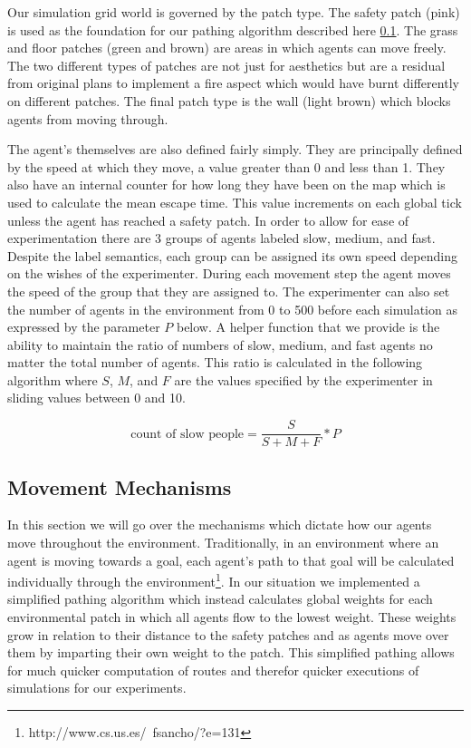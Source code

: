 \documentclass[12pt,letterpaper]{article}
\begin{document}
Our simulation grid world is governed by the patch type.  The safety patch (pink) is used as the foundation for our pathing algorithm described here \ref{move}.  The grass and floor patches (green and brown) are areas in which agents can  move freely.  The two different types of patches are not just for aesthetics but are a residual from original plans to implement a fire aspect which would have burnt differently on different patches.  The final patch type is the wall (light brown) which blocks agents from moving through.

The agent's themselves are also defined fairly simply.  They are principally defined by the speed at which they move, a value greater than 0 and less than 1.  They also have an internal counter for how long they have been on the map which is used to calculate the mean escape time.  This value increments on each global tick unless the agent has reached a safety patch.  In order to allow for ease of experimentation there are 3 groups of agents labeled slow, medium, and fast.  Despite the label semantics, each group can be assigned its own speed depending on the wishes of the experimenter.  During each movement step the agent moves the speed of the group that they are assigned to.  The experimenter can also set the number of agents in the environment from 0 to 500 before each simulation as expressed by the parameter $P$ below.  A helper function that we provide is the ability to maintain the ratio of numbers of slow, medium, and fast agents no matter the total number of agents.  This ratio is calculated in the following algorithm where $S$, $M$, and $F$ are the values specified by the experimenter in sliding values between 0 and 10.

\begin{equation}
\text{count of slow people} =\frac { S} {S + M + F} * P
\end{equation}

\subsection{Movement Mechanisms} \label{move}
In this section we will go over the mechanisms which dictate how our agents move throughout the environment.  Traditionally, in an environment where an agent is moving towards a goal, each agent's path to that goal will be calculated individually through the environment\footnote{http://www.cs.us.es/~fsancho/?e=131}.  In our situation we implemented a simplified pathing algorithm which instead calculates global weights for each environmental patch in which all agents flow to the lowest weight.  These weights grow in relation to their distance to the safety patches and as agents move over them by imparting their own weight to the patch.  This simplified pathing allows for much quicker computation of routes and therefor quicker executions of simulations for our experiments.
\end{document}
